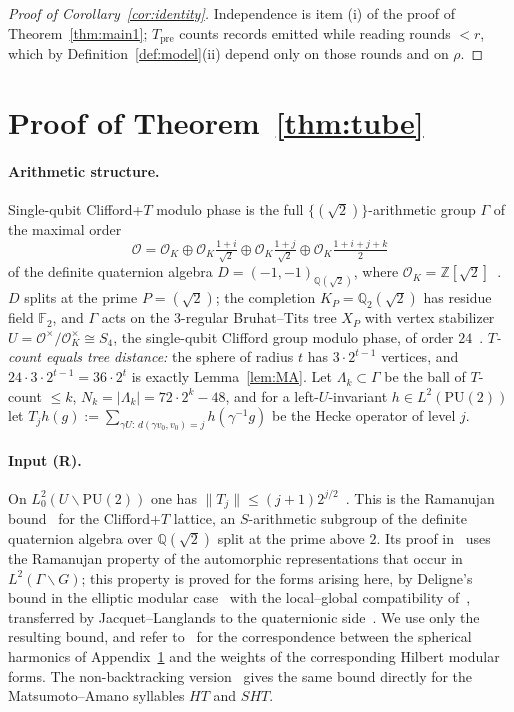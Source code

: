 \documentclass[aps,prx,twocolumn,superscriptaddress,nofootinbib,longbibliography]{revtex4-2}
\theoremstyle{plain}
\theoremstyle{definition}
\theoremstyle{remark}
\newcommand{\Tpre}{T_{\mathrm{pre}}}
\newcommand{\Z}{\mathbb{Z}}
\newcommand{\Q}{\mathbb{Q}}
\newcommand{\F}{\mathbb{F}}
\newcommand{\PU}{\mathrm{PU}(2)}
\begin{document}
\begin{proof}[Proof of Corollary~\ref{cor:identity}]
Independence is item (i) of the proof of Theorem~\ref{thm:main1}; $\Tpre$ counts records emitted while reading rounds $<r$, which by Definition~\ref{def:model}(ii) depend only on those rounds and on $\rho$.
\end{proof}

\section{Proof of Theorem~\ref{thm:tube}}\label{app:tube}

\paragraph{Arithmetic structure.} Single-qubit Clifford+$T$ modulo phase is the full $\{(\sqrt2)\}$-arithmetic group $\Gamma$ of the maximal order
\begin{equation}
\mathcal O=\mathcal O_K\oplus\mathcal O_K\tfrac{1+i}{\sqrt2}\oplus\mathcal O_K\tfrac{1+j}{\sqrt2}\oplus\mathcal O_K\tfrac{1+i+j+k}{2}\label{eq:order}
\end{equation}
of the definite quaternion algebra $D=(-1,-1)_{\Q(\sqrt2)}$, where $\mathcal O_K=\Z[\sqrt2]$~\cite{KMM13,PS18}. $D$ splits at the prime $P=(\sqrt2)$; the completion $K_P=\Q_2(\sqrt2)$ has residue field $\F_2$, and $\Gamma$ acts on the $3$-regular Bruhat--Tits tree $X_P$ with vertex stabilizer $U=\mathcal O^\times/\mathcal O_K^\times\cong S_4$, the single-qubit Clifford group modulo phase, of order $24$~\cite[\S4.1.3]{PS18}. \emph{$T$-count equals tree distance:} the sphere of radius $t$ has $3\cdot2^{t-1}$ vertices, and $24\cdot3\cdot2^{t-1}=36\cdot2^t$ is exactly Lemma~\ref{lem:MA}. Let $\Lambda_k\subset\Gamma$ be the ball of $T$-count $\le k$, $N_k=|\Lambda_k|=72\cdot2^k-48$, and for a left-$U$-invariant $h\in L^2(\PU)$ let $T_jh(g):=\sum_{\gamma U:\,d(\gamma v_0,v_0)=j}h(\gamma^{-1}g)$ be the Hecke operator of level $j$.

\paragraph{Input (R).} On $L^2_0(U\backslash\PU)$ one has $\|T_j\|\le(j+1)2^{j/2}$~\cite[Eq.~(3.10)]{PS18}. This is the Ramanujan bound~\cite{LPS,LPSII} for the Clifford+$T$ lattice, an $S$-arithmetic subgroup of the definite quaternion algebra over $\Q(\sqrt2)$ split at the prime above $2$. Its proof in~\cite{PS18} uses the Ramanujan property of the automorphic representations that occur in $L^2(\Gamma\backslash G)$; this property is proved for the forms arising here, by Deligne's bound in the elliptic modular case~\cite{Deligne} with the local--global compatibility of~\cite{HarrisTaylor}, transferred by Jacquet--Langlands to the quaternionic side~\cite{Blasius}. We use only the resulting bound, and refer to~\cite[Sec.~3]{PS18} for the correspondence between the spherical harmonics of Appendix~\ref{app:tube} and the weights of the corresponding Hilbert modular forms. The non-backtracking version~\cite[Eqs.~(5.2)--(5.3)]{PS18} gives the same bound directly for the Matsumoto--Amano syllables $HT$ and $SHT$.
\end{document}
